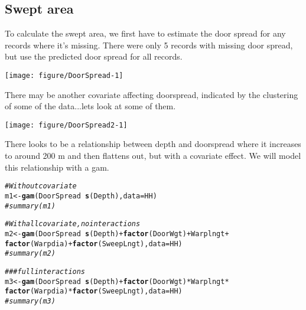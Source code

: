 \documentclass[12pt]{article}\usepackage[]{graphicx}\usepackage[]{color}
\makeatletter
\def\maxwidth{ %
  \ifdim\Gin@nat@width>\linewidth
    \linewidth
  \else
    \Gin@nat@width
  \fi
}
\newcommand{\hlcom}[1]{\textcolor[rgb]{0.678,0.584,0.686}{\textit{#1}}}%
\newcommand{\hlopt}[1]{\textcolor[rgb]{0,0,0}{#1}}%
\newcommand{\hlstd}[1]{\textcolor[rgb]{0.345,0.345,0.345}{#1}}%
\newcommand{\hlkwb}[1]{\textcolor[rgb]{0.69,0.353,0.396}{#1}}%
\newcommand{\hlkwc}[1]{\textcolor[rgb]{0.333,0.667,0.333}{#1}}%
\newcommand{\hlkwd}[1]{\textcolor[rgb]{0.737,0.353,0.396}{\textbf{#1}}}%
\newenvironment{kframe}{%
 \def\at@end@of@kframe{}%
 \ifinner\ifhmode%
  \def\at@end@of@kframe{\end{minipage}}%
  \begin{minipage}{\columnwidth}%
 \fi\fi%
 \def\FrameCommand##1{\hskip\@totalleftmargin \hskip-\fboxsep
 \colorbox{shadecolor}{##1}\hskip-\fboxsep
     \hskip-\linewidth \hskip-\@totalleftmargin \hskip\columnwidth}%
 \MakeFramed {\advance\hsize-\width
   \@totalleftmargin\z@ \linewidth\hsize
   \@setminipage}}%
 {\par\unskip\endMakeFramed%
 \at@end@of@kframe}
\newenvironment{knitrout}{}{} %
\makeatother
\begin{document}
\subsection{Swept area}

To calculate the swept area, we first have to estimate the door spread for any
records where it's missing. There were only 5 records with missing door spread,
but use the predicted door spread for all records. \\

\begin{knitrout}\footnotesize
{}\color{fgcolor}

{\centering \texttt{[image: figure/DoorSpread-1]} 

}



\end{knitrout}

There may be another covariate affecting doorspread, indicated by the
clustering of some of the data...lets look at some of them.

\begin{knitrout}\footnotesize
{}\color{fgcolor}

{\centering \texttt{[image: figure/DoorSpread2-1]} 

}



\end{knitrout}

There looks to be a relationship between depth and doorspread where it
increases to around 200 m and then flattens out, but with a covariate effect.
We will model this relationship with a gam. 

\begin{kframe}
\begin{alltt}
\hlcom{# Without covariate}
\hlstd{m1} \hlkwb{<-} \hlkwd{gam}\hlstd{(DoorSpread} \hlopt{~} \hlkwd{s}\hlstd{(Depth),} \hlkwc{data} \hlstd{= HH)}
\hlcom{#summary(m1)}

\hlcom{# With all covariate, no interactions}
\hlstd{m2} \hlkwb{<-} \hlkwd{gam}\hlstd{(DoorSpread} \hlopt{~} \hlkwd{s}\hlstd{(Depth)} \hlopt{+} \hlkwd{factor}\hlstd{(DoorWgt)} \hlopt{+} \hlstd{Warplngt} \hlopt{+}
          \hlkwd{factor}\hlstd{(Warpdia)} \hlopt{+} \hlkwd{factor}\hlstd{(SweepLngt),} \hlkwc{data} \hlstd{=   HH)}
\hlcom{#summary(m2)}

\hlcom{### full interactions}
\hlstd{m3} \hlkwb{<-} \hlkwd{gam}\hlstd{(DoorSpread} \hlopt{~} \hlkwd{s}\hlstd{(Depth)} \hlopt{+} \hlkwd{factor}\hlstd{(DoorWgt)} \hlopt{*} \hlstd{Warplngt} \hlopt{*}
          \hlkwd{factor}\hlstd{(Warpdia)} \hlopt{*} \hlkwd{factor}\hlstd{(SweepLngt),} \hlkwc{data} \hlstd{=   HH)}
\hlcom{#summary(m3)}
\end{alltt}
\end{kframe}
\end{document}
